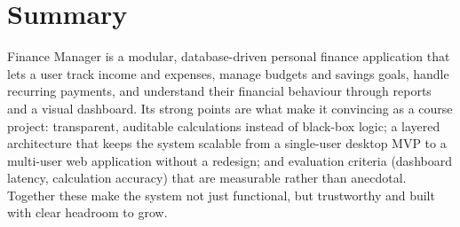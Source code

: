 \documentclass{article}
\begin{document}
\section{Summary}
Finance Manager is a modular, database-driven personal finance application that lets a user track income and expenses, manage budgets and savings goals, handle recurring payments, and understand their financial behaviour through reports and a visual dashboard. Its strong points are what make it convincing as a course project: transparent, auditable calculations instead of black-box logic; a layered architecture that keeps the system scalable from a single-user desktop MVP to a multi-user web application without a redesign; and evaluation criteria (dashboard latency, calculation accuracy) that are measurable rather than anecdotal. Together these make the system not just functional, but trustworthy and built with clear headroom to grow.
\end{document}
